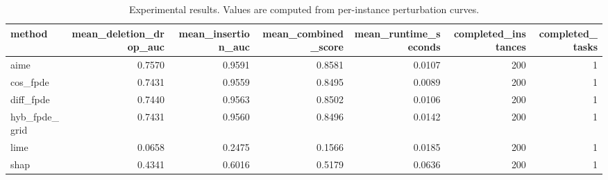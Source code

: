 \begin{table}[t]
\caption{Experimental results. Values are computed from per-instance perturbation curves.}
\label{tab:main_results_computed}
\centering
\begin{tabular}{lrrrrrr}
\toprule
method & mean\_deletion\_drop\_auc & mean\_insertion\_auc & mean\_combined\_score & mean\_runtime\_seconds & completed\_instances & completed\_tasks \\
\midrule
aime & 0.7570 & 0.9591 & 0.8581 & 0.0107 & 200 & 1 \\
cos\_fpde & 0.7431 & 0.9559 & 0.8495 & 0.0089 & 200 & 1 \\
diff\_fpde & 0.7440 & 0.9563 & 0.8502 & 0.0106 & 200 & 1 \\
hyb\_fpde\_grid & 0.7431 & 0.9560 & 0.8496 & 0.0142 & 200 & 1 \\
lime & 0.0658 & 0.2475 & 0.1566 & 0.0185 & 200 & 1 \\
shap & 0.4341 & 0.6016 & 0.5179 & 0.0636 & 200 & 1 \\
\bottomrule
\end{tabular}

\end{table}
